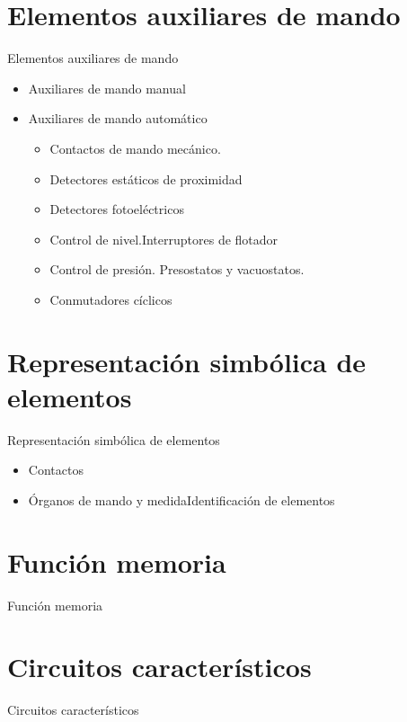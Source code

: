 \documentclass{beamer}
\begin{document}
\section{Elementos auxiliares de mando}
\begin{frame}{Elementos auxiliares de mando}
    \begin{itemize}
        \item Auxiliares de mando manual
        \item Auxiliares de mando automático
        \begin{itemize}
            \item Contactos de mando mecánico.
            \item Detectores estáticos de proximidad
            \item Detectores fotoeléctricos
            \item Control de nivel.Interruptores de flotador
            \item Control de presión. Presostatos y vacuostatos.
            \item Conmutadores cíclicos
        \end{itemize}
    \end{itemize}


\end{frame}


\section{Representación simbólica de elementos}
\begin{frame}{Representación simbólica de elementos}
    \begin{itemize}
        \item Contactos
        \item Órganos de mando y medidaIdentificación de elementos
    \end{itemize}

\end{frame}

\section{Función memoria}
\begin{frame}{Función memoria}

\end{frame}

\section{Circuitos característicos}
\begin{frame}{Circuitos característicos}

\end{frame}




\ThankYouFrame
\end{document}
